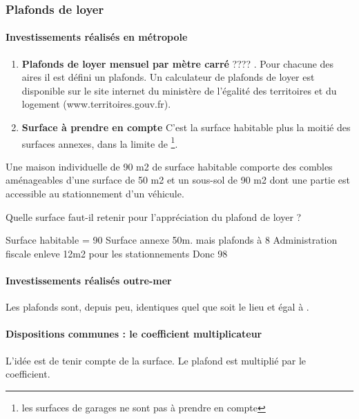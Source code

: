 			\subsubsection{Plafonds de loyer}


				\paragraph{Investissements réalisés en métropole}

					\begin{enumerate}[label=\alpha*.]
						\item \textbf{Plafonds de loyer mensuel par mètre carré} ???? \cgi. Pour chacune des aires il est défini un plafonds.
						Un calculateur de plafonds de loyer est disponible sur le site internet du ministère de l'égalité des territoires et du logement (www.territoires.gouv.fr).
						\item \textbf{Surface à prendre en compte} C'est la surface habitable plus la moitié des surfaces annexes, dans la limite de \footnote{les surfaces de garages ne sont pas à prendre en compte}.
					\end{enumerate}

					\begin{casPratique}{%
						Une maison individuelle de 90 m2 de surface habitable comporte des combles aménageables d'une surface de 50 m2 et un sous-sol de 90 m2 dont une partie est accessible au stationnement d'un véhicule.

						Quelle surface faut-il retenir pour l’appréciation du plafond de loyer ?}

						Surface habitable = 90
						Surface annexe 50m. mais plafonds à 8
						Administration fiscale enleve 12m2 pour les stationnements
						Donc 98
					\end{casPratique}

				\paragraph{Investissements réalisés outre-mer} Les plafonds sont, depuis peu, identiques quel que soit le lieu et égal à .


				\paragraph{Dispositions communes : le coefficient multiplicateur} L'idée est de tenir compte de la surface. Le plafond est multiplié par le coefficient.




